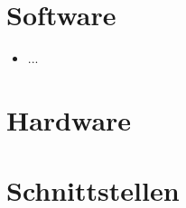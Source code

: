\section{Software}
   \begin{itemize}
      \item ...
   \end{itemize}
\section{Hardware}   
\section{Schnittstellen}